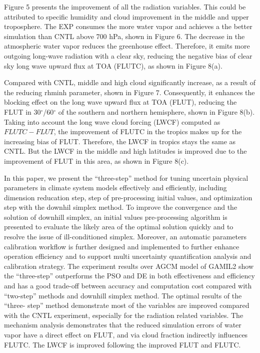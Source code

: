 \documentclass[gmd, manuscript]{copernicus}
\begin{document}
Figure 5 presents the improvement of all the radiation variables. This could be attributed to  specific humidity and cloud improvement in the middle and upper troposphere. The EXP consumes the more water vapor and achieves a the better simulation than CNTL above 700 hPa, shown in Figure 6. The decrease in the atmospheric water vapor reduces the greenhouse effect. Therefore, it emits more outgoing long-wave radiation with a clear sky, reducing the negative bias of clear sky long wave upward flux at TOA (FLUTC), as shown in Figure 8(a). 


Compared with CNTL, middle and high cloud significantly increase, as a result of the reducing rhminh parameter, shown in Figure 7. Consequently, it enhances the blocking effect on the long wave upward flux at TOA (FLUT), reducing the FLUT in 30$^\circ$/60$^\circ$ of the southern and northern hemisphere, shown in Figure 8(b). Taking into account the long wave cloud forcing (LWCF) computed as $FLUTC - FLUT$, the improvement of FLUTC in the tropics  makes up for the increasing bias of FLUT. Therefore, the LWCF in tropics stays the same as CNTL. But the LWCF in the middle and high latitudes is improved due to the improvement of FLUT in this area, as shown in Figure 8(c).


\conclusions  %

In this paper, we present the ``three-step'' method for tuning uncertain physical parameters in climate system models effectively and efficiently, including dimension reducation step, step of pre-processing initial values, and optimization step with the downhil simplex method. To improve the convergence and the solution of downhill simplex, an initial values pre-processing algorithm is presented to evaluate the likely area of the optimal solution quickly and to resolve the issue of ill-conditioned simplex. Moreover, an automatic parameters calibration workflow is further designed and implemented to further enhance operation efficiency and to support multi uncertainty quantification analysis and calibration strategy. The experiment results over AGCM model of GAMIL2 show the ``three-step'' outperforms the PSO and DE in both effectiveness and efficiency and has a good trade-off between accuracy and computation cost compared with ``two-step'' methods and downhill simplex method. The optimal results of the ``three- step'' method demonstrate most of the variables are improved compared with the CNTL experiment, especially for the radiation related variables. The mechanism analysis demonstrates that the reduced simulation errors of water  vapor have a direct effect on FLUT, and via cloud fraction indirectly influences FLUTC. The  LWCF is improved following the improved FLUT and FLUTC.
\end{document}
